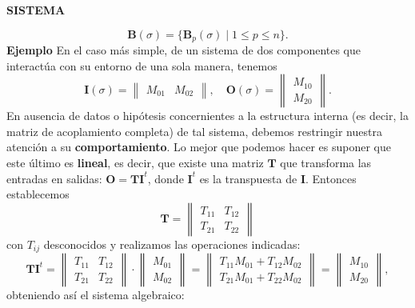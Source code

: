 \newpage
\fancyhf{}
\fancyhead[r]{\thepage} 
\begin{center}
{\fontsize{13}{16}\selectfont \textbf{SISTEMA }}
\end{center}
\vspace{0.5cm}

{\fontsize{13}{15}\selectfont
$$ \mathbf{B}(\sigma) = \{\mathbf{B}_p(\sigma) \mid 1 \le p \le n \}. $$
\textbf{Ejemplo} En el caso más simple, de un sistema de dos componentes que interactúa con su entorno de una sola manera, tenemos
$$ \mathbf{I}(\sigma) = \begin{Vmatrix} M_{01} & M_{02} \end{Vmatrix}, \quad \mathbf{O}(\sigma) = \begin{Vmatrix} M_{10} \\ M_{20} \end{Vmatrix}. $$
En ausencia de datos o hipótesis concernientes a la estructura interna (es decir, la matriz de acoplamiento completa) de tal sistema, debemos restringir nuestra atención a su \textbf{comportamiento}. Lo mejor que podemos hacer es suponer que este último es \textbf{lineal}, es decir, que existe una matriz $\mathbf{T}$ que transforma las entradas en salidas: $\mathbf{O} = \mathbf{T} \mathbf{I}^t$, donde $\mathbf{I}^t$ es la transpuesta de $\mathbf{I}$. Entonces establecemos
$$ \mathbf{T} = \begin{Vmatrix} T_{11} & T_{12} \\ T_{21} & T_{22} \end{Vmatrix} $$
con $T_{ij}$ desconocidos y realizamos las operaciones indicadas:
$$ \mathbf{T} \mathbf{I}^t = \begin{Vmatrix} T_{11} & T_{12} \\ T_{21} & T_{22} \end{Vmatrix} \cdot \begin{Vmatrix} M_{01} \\ M_{02} \end{Vmatrix} = \begin{Vmatrix} T_{11}M_{01} + T_{12}M_{02} \\ T_{21}M_{01} + T_{22}M_{02} \end{Vmatrix} = \begin{Vmatrix} M_{10} \\ M_{20} \end{Vmatrix}, $$
obteniendo así el sistema algebraico:
\begin{gather*}

\end{gather*}}
